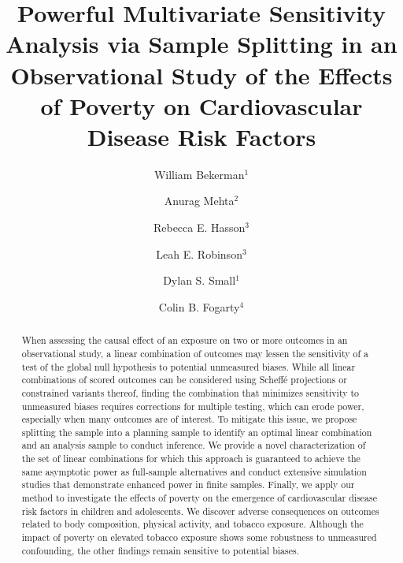 \documentclass[12pt,leqno,titlepage]{amsart}
\newcommand{\1}{\mathbbm{1}}
\begin{document}
\def\spacingset#1{\renewcommand{\baselinestretch}%
{#1}\small\normalsize} \spacingset{1}
\begin{bibunit}



\title[Sensitivity analysis for observational studies with many outcomes]{\fontsize{15.8}{19}\selectfont Powerful Multivariate Sensitivity Analysis via Sample Splitting in an Observational Study of the Effects of Poverty on Cardiovascular Disease Risk Factors}

\author{William Bekerman$^{1}$} 
\author{Anurag Mehta$^{2}$}
\author{Rebecca E. Hasson$^{3}$}
\author{Leah E. Robinson$^{3}$}
\author{\newline Dylan S. Small$^{1}$}
\author{Colin B. Fogarty$^{4}$}





\begin{abstract}
 When assessing the causal effect of an exposure on two or more outcomes in an observational study, a linear combination of outcomes may lessen the sensitivity of a test of the global null hypothesis to potential unmeasured biases. While all linear combinations of scored outcomes can be considered using Scheff\'e projections or constrained variants thereof, finding the combination that minimizes sensitivity to unmeasured biases requires corrections for multiple testing, which can erode power, especially when many outcomes are of interest. To mitigate this issue, we propose splitting the sample into a planning sample to identify an optimal linear combination and an analysis sample to conduct inference. We provide a novel characterization of the set of linear combinations for which this approach is guaranteed to achieve the same asymptotic power as full-sample alternatives and conduct extensive simulation studies that demonstrate enhanced power in finite samples. Finally, we apply our method to investigate the effects of poverty on the emergence of cardiovascular disease risk factors in children and adolescents. We discover adverse consequences on outcomes related to body composition, physical activity, and tobacco exposure. 
 Although the impact of poverty on elevated tobacco exposure shows some robustness to unmeasured confounding, the other findings remain sensitive to potential biases.
\end{abstract}


\end{bibunit}
\end{document}
